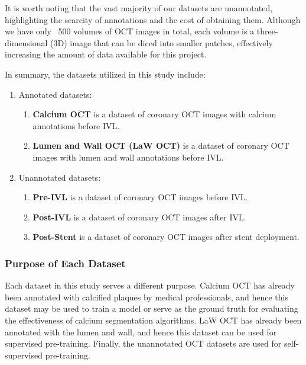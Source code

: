 \documentclass[a4paper,11pt,oneside]{report}
\begin{document}
It is worth noting that the vast majority of our datasets are unannotated, highlighting the scarcity of annotations and the cost of obtaining them. Although we have only ~500 volumes of OCT images in total, each volume is a three-dimensional (3D) image that can be diced into smaller patches, effectively increasing the amount of data available for this project. 

In summary, the datasets utilized in this study include:

\begin{enumerate}
    \item Annotated datasets:
    \begin{enumerate}
        \item \label{enum:calcium-dataset} \textbf{Calcium OCT} is a dataset of coronary OCT images with calcium annotations before IVL.
        \item \label{enum:lumen-and-wall-dataset} \textbf{Lumen and Wall OCT (LaW OCT)} is a dataset of coronary OCT images with lumen and wall annotations before IVL.
    \end{enumerate}
    \item \label{enum:unannotated-dataset} Unannotated datasets:
    \begin{enumerate}
        \item \textbf{Pre-IVL} is a dataset of coronary OCT images before IVL.
        \item \textbf{Post-IVL} is a dataset of coronary OCT images after IVL.
        \item \textbf{Post-Stent} is a dataset of coronary OCT images after stent deployment.
    \end{enumerate}
\end{enumerate}

\subsubsection{Purpose of Each Dataset}

Each dataset in this study serves a different purpose. Calcium OCT has already been annotated with calcified plaques by medical professionals, and hence this dataset may be used to train a model or serve as the ground truth for evaluating the effectiveness of calcium segmentation algorithms. LaW OCT has already been annotated with the lumen and wall, and hence this dataset can be used for supervised pre-training. Finally, the unannotated OCT datasets are used for self-supervised pre-training. 
\end{document}
